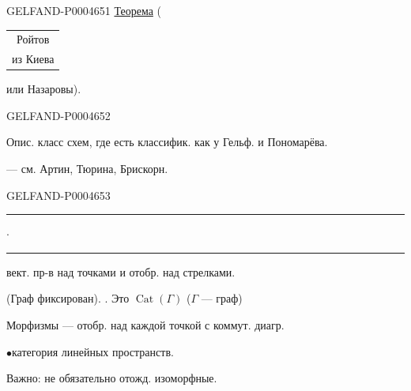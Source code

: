 \begin{GelfandAdjacentEvidence}{GELFAND-P000465}{1}
\underline{Теорема}\quad
(\begin{tabular}[t]{@{}c@{}}Ройтов\\[-.45ex]\scriptsize из Киева\end{tabular}
или Назаровы).
\end{GelfandAdjacentEvidence}
\begin{GelfandAdjacentEvidence}{GELFAND-P000465}{2}


Опис. класс схем, где есть классифик. как у Гельф. и Пономарёва.

\quad — см. Артин, Тюрина, Брискорн.
\end{GelfandAdjacentEvidence}
\begin{GelfandAdjacentEvidence}{GELFAND-P000465}{3}


\begin{center}
\rule[.5ex]{18mm}{.35pt}\enspace$\cdot$\enspace\rule[.5ex]{25mm}{.35pt}
\end{center}

\quad {} вект. пр-в над точками и отобр. над стрелками.

(Граф фиксирован). \quad {}. Это $\operatorname{Cat}(\Gamma)$
($\Gamma$ — граф)

Морфизмы — отобр. над каждой точкой с коммут. диагр.

$\bullet$\qquad категория линейных пространств.

Важно: не обязательно отожд. изоморфные.
\end{GelfandAdjacentEvidence}
